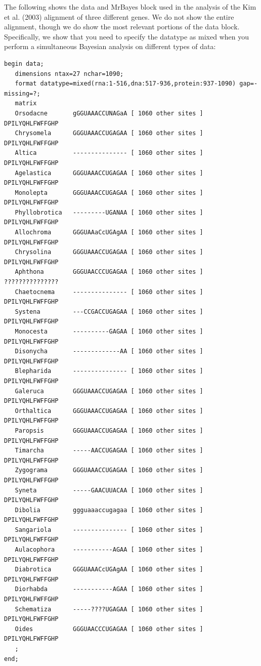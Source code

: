 \documentclass{svmult}
\begin{document}
 The following shows the
data and MrBayes block used in the analysis of the Kim et al. (2003) alignment of three different
genes. We do not show the entire alignment, though we do show the most relevant portions of the
data block. Specifically, we show that you need to specify the datatype as mixed when you perform a
simultaneous Bayesian analysis on different types of data:
\scriptsize
\begin{verbatim}
begin data;
   dimensions ntax=27 nchar=1090;
   format datatype=mixed(rna:1-516,dna:517-936,protein:937-1090) gap=- missing=?;
   matrix
   Orsodacne       gGGUAAACCUNAGaA [ 1060 other sites ] DPILYQHLFWFFGHP
   Chrysomela      GGGUAAACCUGAGAA [ 1060 other sites ] DPILYQHLFWFFGHP
   Altica          --------------- [ 1060 other sites ] DPILYQHLFWFFGHP
   Agelastica      GGGUAAACCUGAGAA [ 1060 other sites ] DPILYQHLFWFFGHP
   Monolepta       GGGUAAACCUGAGAA [ 1060 other sites ] DPILYQHLFWFFGHP
   Phyllobrotica   ---------UGANAA [ 1060 other sites ] DPILYQHLFWFFGHP
   Allochroma      GGGUAAaCcUGAgAA [ 1060 other sites ] DPILYQHLFWFFGHP
   Chrysolina      GGGUAAACCUGAGAA [ 1060 other sites ] DPILYQHLFWFFGHP
   Aphthona        GGGUAACCCUGAGAA [ 1060 other sites ] ???????????????
   Chaetocnema     --------------- [ 1060 other sites ] DPILYQHLFWFFGHP
   Systena         ---CCGACCUGAGAA [ 1060 other sites ] DPILYQHLFWFFGHP
   Monocesta       ----------GAGAA [ 1060 other sites ] DPILYQHLFWFFGHP
   Disonycha       -------------AA [ 1060 other sites ] DPILYQHLFWFFGHP
   Blepharida      --------------- [ 1060 other sites ] DPILYQHLFWFFGHP
   Galeruca        GGGUAAACCUGAGAA [ 1060 other sites ] DPILYQHLFWFFGHP
   Orthaltica      GGGUAAACCUGAGAA [ 1060 other sites ] DPILYQHLFWFFGHP
   Paropsis        GGGUAAACCUGAGAA [ 1060 other sites ] DPILYQHLFWFFGHP
   Timarcha        -----AACCUGAGAA [ 1060 other sites ] DPILYQHLFWFFGHP
   Zygograma       GGGUAAACCUGAGAA [ 1060 other sites ] DPILYQHLFWFFGHP
   Syneta          -----GAACUUACAA [ 1060 other sites ] DPILYQHLFWFFGHP
   Dibolia         ggguaaaccugagaa [ 1060 other sites ] DPILYQHLFWFFGHP
   Sangariola      --------------- [ 1060 other sites ] DPILYQHLFWFFGHP
   Aulacophora     -----------AGAA [ 1060 other sites ] DPILYQHLFWFFGHP
   Diabrotica      GGGUAAACcUGAgAA [ 1060 other sites ] DPILYQHLFWFFGHP
   Diorhabda       -----------AGAA [ 1060 other sites ] DPILYQHLFWFFGHP
   Schematiza      -----????UGAGAA [ 1060 other sites ] DPILYQHLFWFFGHP
   Oides           GGGUAACCCUGAGAA [ 1060 other sites ] DPILYQHLFWFFGHP
   ;
end;


\end{verbatim}
\end{document}
